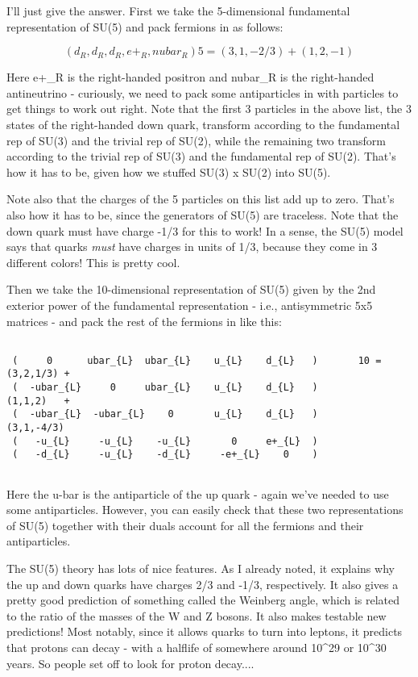 I'll just give the answer.  First we take the 5-dimensional fundamental
representation of SU(5) and pack fermions in as follows:


$$

(d_{R}, d_{R}, d_{R}, e+_{R}, nubar_{R})             5 = (3,1,-2/3) + (1,2,-1)

$$
    
Here e+_{R} is the right-handed positron and nubar_{R} is the right-handed
antineutrino - curiously, we need to pack some antiparticles in with
particles to get things to work out right.  Note that the first 3
particles in the above list, the 3 states of the right-handed down
quark, transform according to the fundamental rep of SU(3) and the
trivial rep of SU(2), while the remaining two transform according to
the trivial rep of SU(3) and the fundamental rep of SU(2).  That's how
it has to be, given how we stuffed SU(3) x SU(2) into SU(5).  

Note also that the charges of the 5 particles on this list add up to
zero.  That's also how it has to be, since the generators of SU(5) are
traceless.  Note that the down quark must have charge -1/3 for this to
work!  In a sense, the SU(5) model says that quarks \emph{must} have
charges in units of 1/3, because they come in 3 different colors!
This is pretty cool.

Then we take the 10-dimensional representation of SU(5) given by
the 2nd exterior power of the fundamental representation - i.e.,
antisymmetric 5x5 matrices - and pack the rest of the fermions in
like this:


\begin{verbatim}

 (     0      ubar_{L}  ubar_{L}    u_{L}    d_{L}   )       10 = (3,2,1/3) + 
 (  -ubar_{L}     0     ubar_{L}    u_{L}    d_{L}   )            (1,1,2)   +
 (  -ubar_{L}  -ubar_{L}    0       u_{L}    d_{L}   )            (3,1,-4/3)
 (   -u_{L}     -u_{L}    -u_{L}       0     e+_{L}  )
 (   -d_{L}     -u_{L}    -d_{L}     -e+_{L}    0    )
                     
\end{verbatim}
    
Here the u-bar is the antiparticle of the up quark - again we've 
needed to use some antiparticles.  However, you can easily check
that these two representations of SU(5) together with their duals
account for all the fermions and their antiparticles.

The SU(5) theory has lots of nice features.  As I already noted, it
explains why the up and down quarks have charges 2/3 and -1/3,
respectively.  It also gives a pretty good prediction of something
called the Weinberg angle, which is related to the ratio of the masses
of the W and Z bosons.  It also makes testable new predictions!  Most
notably, since it allows quarks to turn into leptons, it predicts that
protons can decay - with a halflife of somewhere around 10^{29} or
10^{30} years.  So people set off to look for proton decay....

